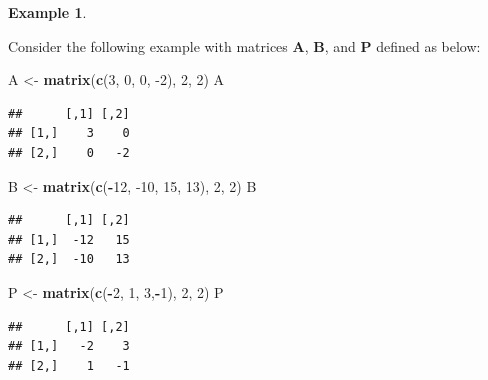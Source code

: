 \documentclass[
]{book}
\newenvironment{Shaded}{\begin{snugshade}}{\end{snugshade}}
\newcommand{\DecValTok}[1]{\textcolor[rgb]{0.00,0.00,0.81}{#1}}
\newcommand{\KeywordTok}[1]{\textcolor[rgb]{0.13,0.29,0.53}{\textbf{#1}}}
\newcommand{\NormalTok}[1]{#1}
\newcommand{\OperatorTok}[1]{\textcolor[rgb]{0.81,0.36,0.00}{\textbf{#1}}}
\newcommand{\StringTok}[1]{\textcolor[rgb]{0.31,0.60,0.02}{#1}}
\theoremstyle{definition}
\theoremstyle{definition}
\newtheorem{example}{Example}[chapter]
\theoremstyle{definition}
\theoremstyle{remark}
\begin{document}
\begin{example}
\protect\hypertarget{exm:unlabeled-div-175}{}\label{exm:unlabeled-div-175}

Consider the following example with matrices \(\mathbf{A}\), \(\mathbf{B}\), and \(\mathbf{P}\) defined as below:

\begin{Shaded}
\begin{Highlighting}[]
\NormalTok{A <-}\StringTok{ }\KeywordTok{matrix}\NormalTok{(}\KeywordTok{c}\NormalTok{(}\DecValTok{3}\NormalTok{, }\DecValTok{0}\NormalTok{, }\DecValTok{0}\NormalTok{, }\DecValTok{-2}\NormalTok{), }\DecValTok{2}\NormalTok{, }\DecValTok{2}\NormalTok{)}
\NormalTok{A}
\end{Highlighting}
\end{Shaded}

\begin{verbatim}
##      [,1] [,2]
## [1,]    3    0
## [2,]    0   -2
\end{verbatim}

\begin{Shaded}
\begin{Highlighting}[]
\NormalTok{B <-}\StringTok{ }\KeywordTok{matrix}\NormalTok{(}\KeywordTok{c}\NormalTok{(}\OperatorTok{-}\DecValTok{12}\NormalTok{, }\DecValTok{-10}\NormalTok{, }\DecValTok{15}\NormalTok{, }\DecValTok{13}\NormalTok{), }\DecValTok{2}\NormalTok{, }\DecValTok{2}\NormalTok{)}
\NormalTok{B}
\end{Highlighting}
\end{Shaded}

\begin{verbatim}
##      [,1] [,2]
## [1,]  -12   15
## [2,]  -10   13
\end{verbatim}

\begin{Shaded}
\begin{Highlighting}[]
\NormalTok{P <-}\StringTok{ }\KeywordTok{matrix}\NormalTok{(}\KeywordTok{c}\NormalTok{(}\OperatorTok{-}\DecValTok{2}\NormalTok{, }\DecValTok{1}\NormalTok{, }\DecValTok{3}\NormalTok{,}\OperatorTok{-}\DecValTok{1}\NormalTok{), }\DecValTok{2}\NormalTok{, }\DecValTok{2}\NormalTok{)}
\NormalTok{P}
\end{Highlighting}
\end{Shaded}

\begin{verbatim}
##      [,1] [,2]
## [1,]   -2    3
## [2,]    1   -1
\end{verbatim}


\end{example}
\end{document}
